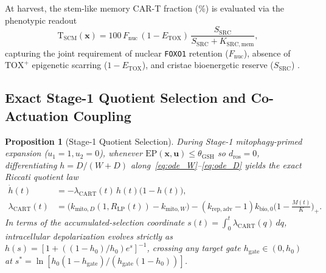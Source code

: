 \documentclass[11pt]{article}
\theoremstyle{plain}
\newtheorem{proposition}{Proposition}
\theoremstyle{remark}
\begin{document}
At harvest, the stem-like memory CAR-T fraction (\%) is evaluated via the phenotypic readout
\begin{equation}
  \mathrm{T}_{\mathrm{SCM}}(\mathbf{x}) = 100\,F_{\mathrm{nuc}}\,(1 - E_{\mathrm{TOX}})\,\frac{S_{\mathrm{SRC}}}{S_{\mathrm{SRC}} + K_{\mathrm{SRC,mem}}},
  \label{eq:tscm_readout}
\end{equation}
capturing the joint requirement of nuclear \texttt{FOXO1} retention ($F_{\mathrm{nuc}}$), absence of $\text{TOX}^+$ epigenetic scarring ($1 - E_{\mathrm{TOX}}$), and cristae bioenergetic reserve ($S_{\mathrm{SRC}}$) \cite{doan2024foxo1,chan2024foxo1,buck2016mitochondrial}.

\subsection{Exact Stage-1 Quotient Selection and Co-Actuation Coupling}

\begin{proposition}[Stage-1 Quotient Selection]
\label{prop:cart_quotient}
During Stage-1 mitophagy-primed expansion ($u_1 = 1, u_2 = 0$), whenever $\mathrm{EP}(\mathbf{x}, \mathbf{u}) \le \theta_{\mathrm{GSH}}$ so $d_{\mathrm{ros}} = 0$, differentiating $h = D/(W+D)$ along~\eqref{eq:ode_W}--\eqref{eq:ode_D} yields the exact Riccati quotient law
\begin{align}
  \dot{h}(t) &= -\lambda_{\mathrm{CART}}(t)\,h(t)\big(1 - h(t)\big), \nonumber\\
  \lambda_{\mathrm{CART}}(t) &= \big(k_{\mathrm{mito},D}(1, R_{\mathrm{LP}}(t)) - k_{\mathrm{mito},W}\big) - (k_{\mathrm{rep,adv}} - 1)k_{\mathrm{bio},0}\Big(1 - \frac{M(t)}{K}\Big)_+.
  \label{eq:cart_riccati}
\end{align}
In terms of the accumulated-selection coordinate $s(t) = \int_0^t \lambda_{\mathrm{CART}}(q)\,dq$, intracellular depolarization evolves strictly as $h(s) = [1 + ((1 - h_0)/h_0)e^s]^{-1}$, crossing any target gate $h_{\mathrm{gate}} \in (0, h_0)$ at $s^* = \ln[h_0(1 - h_{\mathrm{gate}}) / (h_{\mathrm{gate}}(1 - h_0))]$.
\end{proposition}
\end{document}
